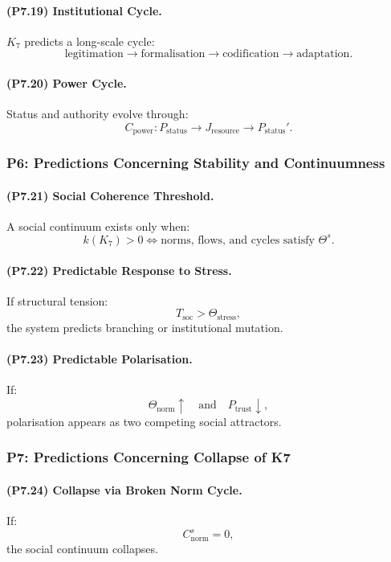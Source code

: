 \paragraph{(P7.19) Institutional Cycle.}
$K_7$ predicts a long-scale cycle:
\[
\text{legitimation} \to \text{formalisation} \to \text{codification} \to \text{adaptation}.
\]

\paragraph{(P7.20) Power Cycle.}
Status and authority evolve through:
\[
C_{\mathrm{power}}: P_{\mathrm{status}} \to J_{\mathrm{resource}} \to P_{\mathrm{status}}'.
\]

\subsubsection{P6: Predictions Concerning Stability and Continuumness}

\paragraph{(P7.21) Social Coherence Threshold.}
A social continuum exists only when:
\[
k(K_7) > 0
\iff
\text{norms, flows, and cycles satisfy } \Theta^s.
\]

\paragraph{(P7.22) Predictable Response to Stress.}
If structural tension:
\[
T_{\mathrm{soc}} > \Theta_{\mathrm{stress}},
\]
the system predicts branching or institutional mutation.

\paragraph{(P7.23) Predictable Polarisation.}
If:
\[
\Theta_{\mathrm{norm}} \uparrow \quad \text{and} \quad P_{\mathrm{trust}} \downarrow,
\]
polarisation appears as two competing social attractors.

\subsubsection{P7: Predictions Concerning Collapse of K7}

\paragraph{(P7.24) Collapse via Broken Norm Cycle.}
If:
\[
C_{\mathrm{norm}}^s = 0,
\]
the social continuum collapses.

